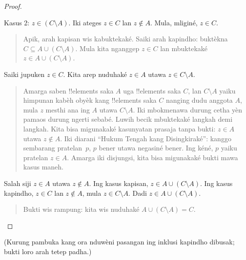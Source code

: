 \documentclass[../../../include/open-logic-section]{subfiles}
\begin{document}
\begin{proof}
\begin{quote}
  \end{quote}
  Kasus 2: $z \in (C \setminus A)$. Iki ateges
  $z \in C$ lan $z
  \notin A$. Mula, mliginé, $z \in C$.
  \begin{quote}
    Apik, arah kapisan wis kabuktekaké. Saiki
    arah kapindho: buktèkna
    $C \subseteq A \cup (C \setminus
    A)$. Mula kita nganggep $z \in C$ lan mbuktekaké
    $z \in A \cup (C
    \setminus A)$.
  \end{quote}
  Saiki jupuken $z \in C$. Kita arep nuduhaké
  $z \in A$ utawa $z \in C
  \setminus A$.
  \begin{quote}
    Amarga saben !!{element}s saka $A$ uga
    !!{element}s saka $C$, lan $C
    \setminus A$ yaiku himpunan kabèh obyèk kang
    !!{element}s saka $C$ nanging dudu anggota $A$,
    mula $z$ mesthi ana ing $A$ utawa $C
    \setminus A$. Iki mbokmenawa durung cetha
    yèn pamaos durung ngerti sebabé. Luwih becik
    mbuktekaké langkah demi langkah. Kita bisa
    migunakaké kasunyatan prasaja tanpa bukti:
    $z \in A$ utawa $z \notin A$. Iki diarani
    ``Hukum Tengah kang Disingkiraké'': kanggo
    sembarang pratelan~$p$, $p$ bener utawa
    negasiné bener. Ing kéné, $p$ yaiku pratelan
    $z \in A$. Amarga iki disjungsi, kita bisa
    migunakaké bukti mawa kasus maneh.
  \end{quote}
  Salah siji $z \in A$ utawa $z \notin A$.
  Ing kasus kapisan, $z \in A \cup
  (C \setminus A)$. Ing kasus kapindho,
  $z \in C$ lan $z \notin A$, mula
  $z \in C \setminus A$. Dadi
  $z \in A \cup (C \setminus A)$.
  \begin{quote}
    Bukti wis rampung: kita wis nuduhaké
    $A \cup (C \setminus A) = C$.
  \end{quote}
\end{proof}
(Kurung pambuka kang ora nduwèni pasangan ing inklusi kapindho dibusak; bukti loro arah tetep padha.)
\end{document}
